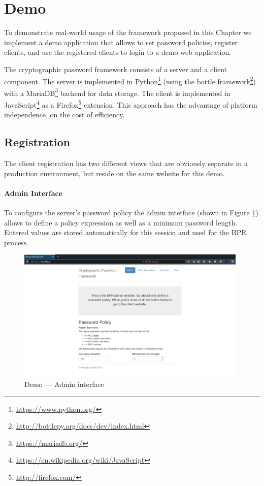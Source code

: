 \section{Demo} \label{sec:vpake-demo}

To demonstrate real-world usage of the framework proposed in this Chapter we implement a demo application that allows to set password policies, register clients, and use the registered clients to login to a demo web application.

The cryptographic password framework consists of a server and a client component.
The server is implemented in Python\footnote{\url{https://www.python.org/}} (using the bottle framework\footnote{\url{http://bottlepy.org/docs/dev/index.html}}) with a MariaDB\footnote{\url{https://mariadb.org/}} backend for data storage.
The client is implemented in JavaScript\footnote{\url{https://en.wikipedia.org/wiki/JavaScript}} as a Firefox\footnote{\url{http://firefox.com/}} extension.
This approach has the advantage of platform independence, on the cost of efficiency.

\subsection{Registration}
The client registration has two different views that are obviously separate in a production environment, but reside on the same website for this demo.

\paragraph{Admin Interface}
To configure the server's password policy the admin interface (shown in Figure \ref{fig:demo-admin}) allows to define a policy expression as well as a minimum password length.
Entered values are stored automatically for this session and used for the \ac{BPR} process.

\begin{figure}[tbph]
\centering
\includegraphics[width=0.98\textwidth]{Figs/demo-admin.png}
\caption{Demo --- Admin interface}\label{fig:demo-admin}
\end{figure}

